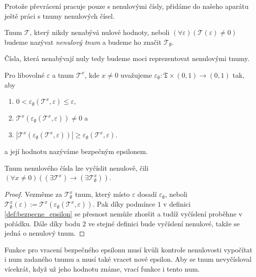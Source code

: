 Protože převrácení pracuje pouze s nenulovými čísly, přidáme do našeho aparátu ještě práci s tnumy nenulových čísel.

\begin{definition}
Tnum $\mathcal{T}$, který nikdy nenabývá nulové hodnoty, neboli $(\forall \varepsilon)(\mathcal{T}(\varepsilon) \neq 0)$ budeme nazývat \textit{nenulový tnum} a budeme ho značit $\mathcal{T}_\emptyset$.
\end{definition}

Čísla, která nenabývají nuly tedy budeme moci reprezentovat nenulovými tnumy.

\begin{definition}\label{def:bezpecne_epsilon}
Pro libovolné $\varepsilon$ a tnum $\mathcal{T}^x$, kde $x\neq 0$ uvažujeme  $\varepsilon_\emptyset : \mathfrak{T}\times(0,1)\to(0,1)$ tak, aby
\begin{enumerate}
\item{$0<\varepsilon_\emptyset(\mathcal{T}^x, \varepsilon)\leq\varepsilon$},
\item{$\mathcal{T}^x(\varepsilon_\emptyset(\mathcal{T}^x, \varepsilon)) \neq 0$} a
\item{$|\mathcal{T}^x(\varepsilon_\emptyset(\mathcal{T}^x, \varepsilon))|\geq\varepsilon_\emptyset(\mathcal{T}^x,\varepsilon)$}.
\end{enumerate}
a její hodnotu nazýváme bezpečným epsilonem.
\end{definition}

\begin{lemma}\label{vet:nenul}
Tnum nenulového čísla lze vyčíslit nenulově, čili $(\forall x \neq 0)((\exists \mathcal{T}^x) \to (\exists \mathcal{T}^x_\emptyset))$. 
\begin{proof}
Vezměme za $\mathcal{T}^x_\emptyset$ tnum, který místo $\varepsilon$ dosadí $\varepsilon_\emptyset$, neboli $\mathcal{T}^x_\emptyset(\varepsilon) := \mathcal{T}^x(\varepsilon_\emptyset(\mathcal{T}^x, \varepsilon))$. Pak díky podmínce $1$ v definici \ref{def:bezpecne_epsilon} se přesnost nemůže zhoršit a tudíž vyčíslení proběhne v pořádku. Dále díky bodu $2$ ve stejné definici bude vyčíslení nenulové, takže se jedná o nenulový tnum.
\end{proof} 
\end{lemma}

Funkce pro vracení bezpečného epsilonu musí kvůli kontrole nenulovosti vypočítat i num zadaného tnumu a musí také vracet nové epsilon. Aby se tnum nevyčísloval vícekrát, když už jeho hodnotu známe, vrací funkce i tento num.

